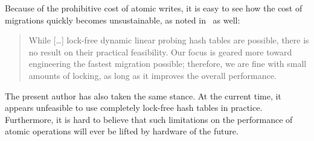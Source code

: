 Because of the prohibitive cost of atomic writes, it is easy to see how the cost of migrations quickly becomes unsustainable, as noted in~\cite{maier} as well:
\begin{quote}
	While [\ldots] lock-free dynamic linear probing hash tables are possible, there is no result on their practical feasibility.
	Our focus is geared more toward engineering the fastest migration possible; therefore, we are fine with small amounts of locking, as long as it improves the overall performance.
\end{quote}

The present author has also taken the same stance.
At the current time, it appears unfeasible to use completely lock-free hash tables in practice.
Furthermore, it is hard to believe that such limitations on the performance of atomic operations will ever be lifted by hardware of the future.
